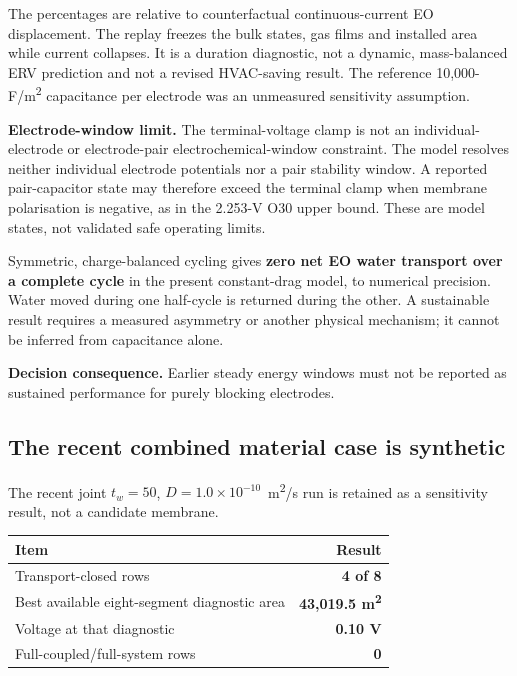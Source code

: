 \documentclass[10pt,a4paper]{article}
\begin{document}
The percentages are relative to counterfactual continuous-current EO
displacement. The replay freezes the bulk states, gas films and installed area
while current collapses. It is a duration diagnostic, not a dynamic,
mass-balanced ERV prediction and not a revised HVAC-saving result. The
reference 10,000-F/m\textsuperscript{2} capacitance per electrode was an
unmeasured sensitivity assumption.

\begin{warningbox}
\textbf{Electrode-window limit.} The terminal-voltage clamp is not an
individual-electrode or electrode-pair electrochemical-window constraint. The
model resolves neither individual electrode potentials nor a pair stability
window. A reported pair-capacitor state may therefore exceed the terminal
clamp when membrane polarisation is negative, as in the 2.253-V O30 upper
bound. These are model states, not validated safe operating limits.
\end{warningbox}

Symmetric, charge-balanced cycling gives \textbf{zero net EO water transport
over a complete cycle} in the present constant-drag model, to numerical
precision. Water moved during one half-cycle is returned during the other.
A sustainable result requires a measured asymmetry or another physical
mechanism; it cannot be inferred from capacitance alone.

\begin{stopbox}
\textbf{Decision consequence.} Earlier steady energy windows must not be
reported as sustained performance for purely blocking electrodes.
\end{stopbox}

\subsection{The recent combined material case is synthetic}

The recent joint \(t_w=50\), \(D=1.0\times10^{-10}\)~m\textsuperscript{2}/s
run is retained as a sensitivity result, not a candidate membrane.

\begin{center}
\begin{tabularx}{0.86\textwidth}{@{}YR@{}}
\toprule
\textbf{Item} & \textbf{Result} \\
\midrule
Transport-closed rows & \textbf{4 of 8} \\
Best available eight-segment diagnostic area & \textbf{43,019.5 m\textsuperscript{2}} \\
Voltage at that diagnostic & \textbf{0.10 V} \\
Full-coupled/full-system rows & \textbf{0} \\
\bottomrule
\end{tabularx}
\end{center}
\end{document}
